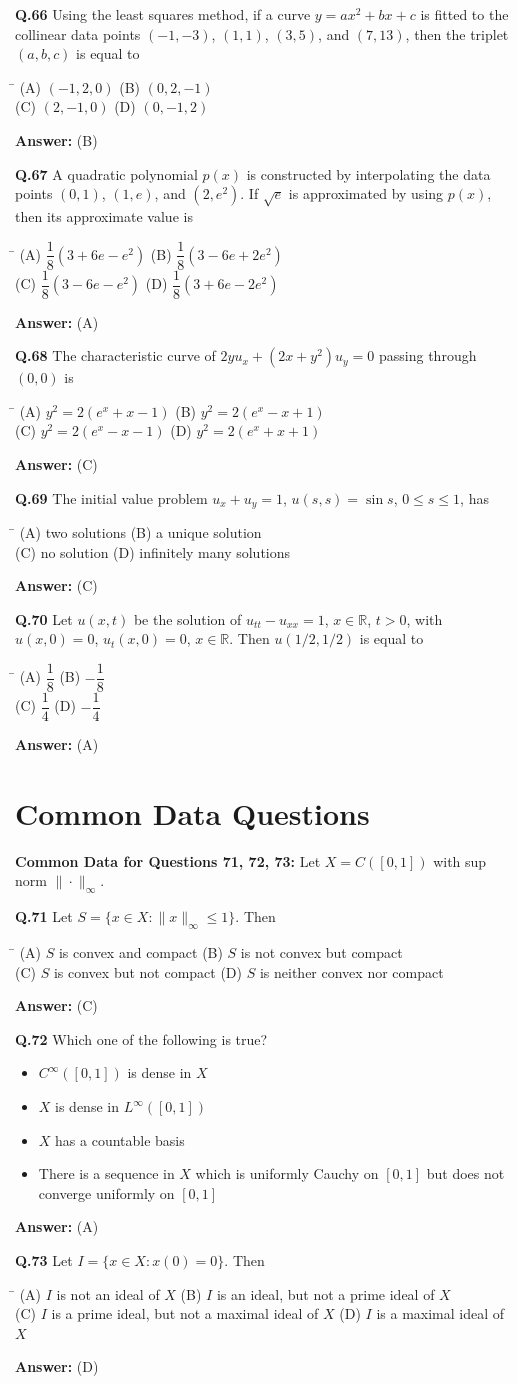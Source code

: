 \documentclass[11pt,a4paper]{article}
\newcommand{\optsfourA}[4]{%
  \begin{tabbing}
    \hspace{0.48\linewidth}\=\kill
    (A) #1 \> (B) #2 \\[2pt]
    (C) #3 \> (D) #4
  \end{tabbing}%
}
\newcommand{\optslistA}[4]{%
  \begin{itemize}
    \setlength{\itemsep}{2pt}\setlength{\parskip}{0pt}
    \item[(A)] #1
    \item[(B)] #2
    \item[(C)] #3
    \item[(D)] #4
  \end{itemize}%
}
\newcommand{\ans}[1]{\textbf{Answer:} #1\par\medskip}
\begin{document}
\textbf{Q.66} Using the least squares method, if a curve $y = ax^2 + bx + c$ is fitted to the collinear data points $(-1, -3)$, $(1, 1)$, $(3, 5)$, and $(7, 13)$, then the triplet $(a, b, c)$ is equal to
\optsfourA{$(-1, 2, 0)$}{$(0, 2, -1)$}{$(2, -1, 0)$}{$(0, -1, 2)$}
\ans{(B)}

\textbf{Q.67} A quadratic polynomial $p(x)$ is constructed by interpolating the data points $(0, 1)$, $(1, e)$, and $(2, e^2)$. If $\sqrt{e}$ is approximated by using $p(x)$, then its approximate value is
\optsfourA{$\dfrac{1}{8}(3 + 6e - e^2)$}{$\dfrac{1}{8}(3 - 6e + 2e^2)$}{$\dfrac{1}{8}(3 - 6e - e^2)$}{$\dfrac{1}{8}(3 + 6e - 2e^2)$}
\ans{(A)}

\textbf{Q.68} The characteristic curve of $2y u_x + (2x + y^2)u_y = 0$ passing through $(0, 0)$ is
\optsfourA{$y^2 = 2(e^x + x - 1)$}{$y^2 = 2(e^x - x + 1)$}{$y^2 = 2(e^x - x - 1)$}{$y^2 = 2(e^x + x + 1)$}
\ans{(C)}

\textbf{Q.69} The initial value problem $u_x + u_y = 1$, $u(s, s) = \sin s$, $0 \le s \le 1$, has
\optsfourA{two solutions}{a unique solution}{no solution}{infinitely many solutions}
\ans{(C)}

\textbf{Q.70} Let $u(x, t)$ be the solution of $u_{tt} - u_{xx} = 1$, $x \in \mathbb{R}$, $t > 0$, with $u(x, 0) = 0$, $u_t(x, 0) = 0$, $x \in \mathbb{R}$. Then $u(1/2, 1/2)$ is equal to
\optsfourA{$\dfrac{1}{8}$}{$-\dfrac{1}{8}$}{$\dfrac{1}{4}$}{$-\dfrac{1}{4}$}
\ans{(A)}

\section*{Common Data Questions}

\textbf{Common Data for Questions 71, 72, 73:}
Let $X = C([0, 1])$ with sup norm $\|\cdot\|_\infty$.

\textbf{Q.71} Let $S = \{x \in X : \|x\|_\infty \le 1\}$. Then
\optsfourA{$S$ is convex and compact}{$S$ is not convex but compact}{$S$ is convex but not compact}{$S$ is neither convex nor compact}
\ans{(C)}

\textbf{Q.72} Which one of the following is true?
\optslistA{$C^\infty([0,1])$ is dense in $X$}{$X$ is dense in $L^\infty([0,1])$}{$X$ has a countable basis}{There is a sequence in $X$ which is uniformly Cauchy on $[0, 1]$ but does not converge uniformly on $[0, 1]$}
\ans{(A)}

\textbf{Q.73} Let $I = \{x \in X : x(0) = 0\}$. Then
\optsfourA{$I$ is not an ideal of $X$}{$I$ is an ideal, but not a prime ideal of $X$}{$I$ is a prime ideal, but not a maximal ideal of $X$}{$I$ is a maximal ideal of $X$}
\ans{(D)}
\end{document}
